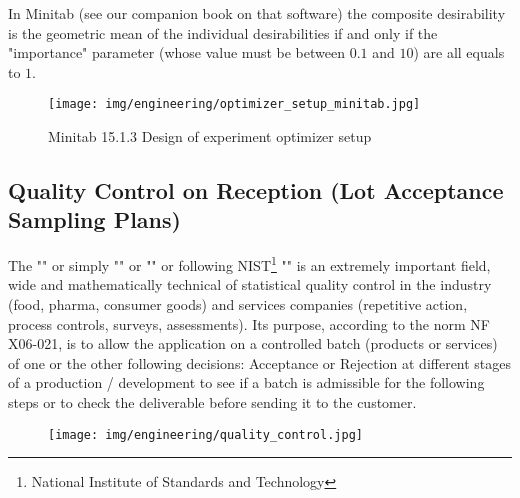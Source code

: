 	In Minitab (see our companion book on that software) the composite desirability is the geometric mean of the individual desirabilities if and only if the "importance" parameter  (whose value must be between $0.1$ and $10$) are all equals to $1$.
	\begin{figure}[H]
		\centering
		\texttt{[image: img/engineering/optimizer\_setup\_minitab.jpg]}
		\caption[]{Minitab 15.1.3 Design of experiment optimizer setup}	
	\end{figure}
	
	\pagebreak
	\subsection{Quality Control on Reception (Lot Acceptance Sampling Plans)}\label{sampling plans}
	The "" or simply "" or "" or following NIST\footnote{National Institute of Standards and Technology} "" is an extremely important field, wide and mathematically technical of statistical quality control in the industry (food, pharma, consumer goods) and services companies (repetitive action, process controls, surveys, assessments). Its purpose, according to the norm NF X06-021, is to allow the application on a controlled batch (products or services) of one or the other following decisions: Acceptance or Rejection at different stages of a production / development to see if a batch is admissible for the following steps or to check the deliverable  before sending it to the customer.
	\begin{figure}[H]
		\centering
		\texttt{[image: img/engineering/quality\_control.jpg]}	
	\end{figure}
